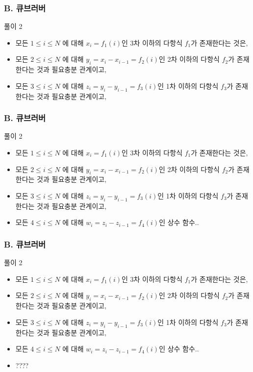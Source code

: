 \documentclass{beamer}
\begin{document}
\begin{frame}
	\frametitle{B. 큐브러버}
	\begin{block}{풀이 2}
		\begin{itemize}			\item 모든 $1 \leq i \leq N$ 에 대해 $x_i = f_1(i)$인 3차 이하의 다항식 $f_1$가 존재한다는 것은, 
			\item 모든 $2 \leq i \leq N$ 에 대해 $y_i = x_i - x_{i-1} = f_2(i)$인 2차 이하의 다항식 $f_2$가 존재한다는 것과 필요충분 관계이고,
			\item 모든 $3 \leq i \leq N$ 에 대해 $z_i = y_i - y_{i-1}= f_3(i)$인 1차 이하의 다항식 $f_3$가 존재한다는 것과 필요충분 관계이고,
		\end{itemize}                                                                         
	\end{block}
\end{frame}


\begin{frame}
	\frametitle{B. 큐브러버}
	\begin{block}{풀이 2}
		\begin{itemize}
			\item 모든 $1 \leq i \leq N$ 에 대해 $x_i = f_1(i)$인 3차 이하의 다항식 $f_1$가 존재한다는 것은, 
\item 모든 $2 \leq i \leq N$ 에 대해 $y_i = x_i - x_{i-1} = f_2(i)$인 2차 이하의 다항식 $f_2$가 존재한다는 것과 필요충분 관계이고,
\item 모든 $3 \leq i \leq N$ 에 대해 $z_i = y_i - y_{i-1}= f_3(i)$인 1차 이하의 다항식 $f_3$가 존재한다는 것과 필요충분 관계이고,
\item 모든 $4 \leq i \leq N$ 에 대해 $w_i = z_i - z_{i-1} = f_4(i)$인 상수 함수..
		\end{itemize}
	\end{block}
\end{frame}


\begin{frame}
	\frametitle{B. 큐브러버}
	\begin{block}{풀이 2}
		\begin{itemize}
			\item 모든 $1 \leq i \leq N$ 에 대해 $x_i = f_1(i)$인 3차 이하의 다항식 $f_1$가 존재한다는 것은, 
\item 모든 $2 \leq i \leq N$ 에 대해 $y_i = x_i - x_{i-1} = f_2(i)$인 2차 이하의 다항식 $f_2$가 존재한다는 것과 필요충분 관계이고,
\item 모든 $3 \leq i \leq N$ 에 대해 $z_i = y_i - y_{i-1}= f_3(i)$인 1차 이하의 다항식 $f_3$가 존재한다는 것과 필요충분 관계이고,
\item 모든 $4 \leq i \leq N$ 에 대해 $w_i = z_i - z_{i-1} = f_4(i)$인 상수 함수..
			\item ????
		\end{itemize}
	\end{block}
\end{frame}
\end{document}
